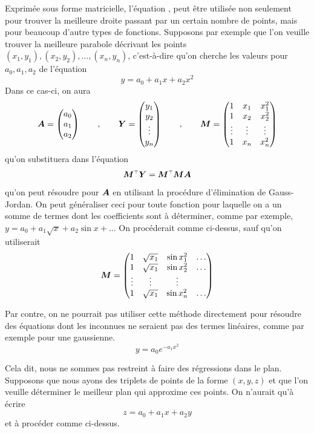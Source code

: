 Exprimée sous forme matricielle, l'équation , 
 peut être utilisée non seulement
pour trouver la meilleure droite passant par un certain nombre de points, mais pour
beaucoup d'autre types de fonctions.  Supposons par exemple que l'on
veuille trouver la meilleure parabole décrivant les points
$(x_1, y_1), (x_2, y_2), \ldots, (x_n, y_n)$, c'est-à-dire qu'on cherche
les valeurs pour $a_0, a_1, a_2$ de l'équation 
\[
y = a_0 + a_1 x + a_2 x^2
\]
Dans ce cas-ci, on aura
\[
\boldsymbol{A} = \begin{pmatrix}
a_0 \\ a_1 \\ a_2
\end{pmatrix}
\qquad,\qquad
\boldsymbol{Y} = \begin{pmatrix}
y_1 \\ y_2 \\ \vdots \\ y_n
\end{pmatrix}
\qquad,\qquad
\boldsymbol{M} = \begin{pmatrix}
1 & x_1 & x_1^2 \\
1 & x_2 & x_2^2 \\
\vdots&\vdots&\vdots\\
1 & x_n & x_n^2
\end{pmatrix}
\]
qu'on substituera dans l'équation
\[
\transp{\matM} \matY =  \transp{\matM}\matM\matA 
\]
qu'on peut résoudre pour $\boldsymbol{A}$ en utilisant la procédure d'élimination de Gauss-Jordan.
On peut généraliser ceci pour toute fonction pour laquelle on a un somme de termes
dont les coefficients sont à déterminer, comme par exemple,
$y = a_0 + a_1 \sqrt{x} + a_2 \sin x + \ldots$  On procéderait comme ci-dessus, sauf
qu'on utiliserait
\[
\boldsymbol{M} = \begin{pmatrix}
1 & \sqrt{x_1} & \sin x_1^2 & \ldots \\
1 & \sqrt{x_1} & \sin x_2^2  & \ldots\\
\vdots&\vdots&\vdots\\
1 & \sqrt{x_1} & \sin x_n^2 & \ldots
\end{pmatrix}
\]

Par contre, on ne pourrait pas utiliser cette méthode directement pour résoudre
des équations dont les inconnues ne seraient pas des termes linéaires, comme
par exemple pour une gaussienne.
\[
y = a_0 e^{-a_1 x^2}
\]

Cela dit, nous ne sommes pas restreint à faire des régressions dans le plan.  
Supposons que nous ayons des triplets de points de la forme $(x,y,z)$ et que l'on
veuille déterminer le meilleur plan qui approxime ces points.
On n'aurait qu'à écrire
\[
z = a_0 + a_1 x + a_2 y
\]
et à procéder comme ci-dessus.
